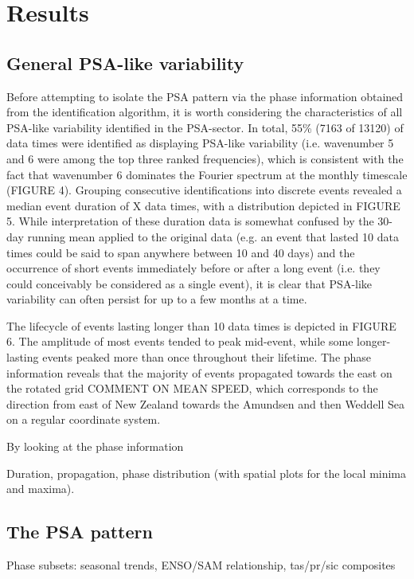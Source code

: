 \section{Results}

\subsection{General PSA-like variability}

Before attempting to isolate the PSA pattern via the phase information obtained from the identification algorithm, it is worth considering the characteristics of all PSA-like variability identified in the PSA-sector. In total, 55\% (7163 of 13120) of data times were identified as displaying PSA-like variability (i.e. wavenumber 5 and 6 were among the top three ranked frequencies), which is consistent with the fact that wavenumber 6 dominates the Fourier spectrum at the monthly timescale (FIGURE 4). Grouping consecutive identifications into discrete events revealed a median event duration of X data times, with a distribution depicted in FIGURE 5. While interpretation of these duration data is somewhat confused by the 30-day running mean applied to the original data (e.g. an event that lasted 10 data times could be said to span anywhere between 10 and 40 days) and the occurrence of short events immediately before or after a long event (i.e. they could conceivably be considered as a single event), it is clear that PSA-like variability can often persist for up to a few months at a time.     

The lifecycle of events lasting longer than 10 data times is depicted in FIGURE 6. The amplitude of most events tended to peak mid-event, while some longer-lasting events peaked more than once throughout their lifetime. The phase information reveals that the majority of events propagated towards the east on the rotated grid COMMENT ON MEAN SPEED, which corresponds to the direction from east of New Zealand towards the Amundsen and then Weddell Sea on a regular coordinate system. 

By looking at the phase information 


Duration, propagation, phase distribution (with spatial plots for the local minima and maxima).

\subsection{The PSA pattern}

Phase subsets: seasonal trends, ENSO/SAM relationship, tas/pr/sic composites







